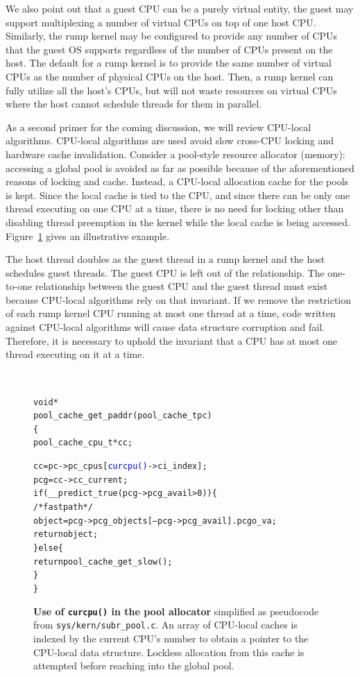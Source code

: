 We also point out that a guest CPU can be a purely virtual entity, \eg
the guest may support multiplexing a number of virtual CPUs on top of
one host CPU.  Similarly, the rump kernel may be configured to provide
any number of CPUs that the guest OS supports regardless of the number of
CPUs present on the host.  The default for a rump kernel is to provide the
same number of virtual CPUs as the number of physical CPUs on the host.
Then, a rump kernel can fully utilize all the host's CPUs, but will not
waste resources on virtual CPUs where the host cannot schedule threads
for them in parallel.

As a second primer for the coming discussion, we will review
CPU-local algorithms.  CPU-local algorithms are used avoid slow
cross-CPU locking and hardware cache invalidation.  Consider a
pool-style resource allocator (\eg memory): accessing a global pool
is avoided as far as possible because of the aforementioned reasons
of locking and cache.  Instead, a CPU-local allocation cache for
the pools is kept.  Since the local cache is tied to the CPU, and since
there can be only one thread executing on one CPU at a time, there is
no need for locking other than disabling thread preemption in the kernel
while the local cache is being accessed.  Figure~\ref{fig:curcpu}
gives an illustrative example.

The host thread doubles as the guest thread in a rump kernel and the host
schedules guest threads.  The guest CPU is left out of the relationship.
The one-to-one relationship between the guest CPU and the guest thread
must exist because CPU-local algorithms rely on that invariant.  If we
remove the restriction of each rump kernel CPU running at most one thread
at a time, code written against CPU-local algorithms will cause data
structure corruption and fail.  Therefore, it is necessary to uphold
the invariant that a CPU has at most one thread executing on it at a time.

\begin{figure}[t]
{\tt \scriptsize
\begin{alltt}
void *
pool_cache_get_paddr(pool_cache_t pc)
\{
    pool_cache_cpu_t *cc;

    cc = pc->pc_cpus[\textcolor{blue}{curcpu()}->ci_index];
    pcg = cc->cc_current;
    if (__predict_true(pcg->pcg_avail > 0)) \{
            /* fastpath */
            object = pcg->pcg_objects[--pcg->pcg_avail].pcgo_va;
            return object;
    \} else \{
            return pool_cache_get_slow();
    \}
\}
\end{alltt}}
\caption[Use of \texttt{curcpu()} in the pool allocator]
{\textbf{Use of \texttt{curcpu()} in the pool allocator}
simplified as pseudocode from \texttt{sys/kern/subr\_pool.c}.
An array of CPU-local caches is indexed by the current CPU's number to
obtain a pointer to the CPU-local data structure.  Lockless allocation
from this cache is attempted before reaching into the global pool.
}
\label{fig:curcpu}
\end{figure}

